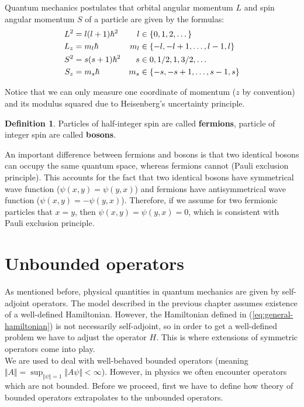 \documentclass[11pt, a4paper, german]{article}
\theoremstyle{plain}
\theoremstyle{definition}
\newtheorem{definition}[theorem]{Definition}
\theoremstyle{remark}
\numberwithin{equation}{section}
\numberwithin{theorem}{section}
\begin{document}
Quantum mechanics postulates that orbital angular momentum $L$ and spin angular momentum $S$ of a particle are given by the formulas:
\begin{align}
L^2 &= l(l+1)\hbar^2 &l   &\in \mathbb \{0, 1, 2, \dots\} \label{eq:l2} \\
L_z &= m_l\hbar      &m_l &\in \{-l, -l+1, \dots, l-1, l\} \label{eq:lz}\\
S^2 &= s(s+1)\hbar^2 &s   &\in {0, 1/2, 1, 3/2, \dots} \label{eq:s2}\\
S_z &= m_s\hbar      &m_s &\in \{-s, -s+1, \dots, s-1, s\} \label{eq:sz}
\end{align}

Notice that we can only measure one coordinate of momentum ($z$ by convention) and its modulus squared due to Heisenberg's uncertainty principle.

\begin{definition}
Particles of half-integer spin are called \textbf{fermions}, particle of integer spin are called \textbf{bosons}.
\end{definition}

An important difference between fermions and bosons is that two identical bosons can occupy the same quantum space, whereas fermions cannot (Pauli exclusion principle). This accounts for the fact that two identical bosons have symmetrical wave function ($\psi(x, y) = \psi(y, x)$) and fermions have antisymmetrical wave function ($\psi(x, y) = -\psi(y, x)$). Therefore, if we assume for two fermionic particles that $x=y$, then $\psi(x,y)=\psi(y,x)=0$, which is consistent with Pauli exclusion principle.\\

\section{Unbounded operators}\label{sec:self-adjoint-operators}

As mentioned before, physical quantities in quantum mechanics are given by self-adjoint operators. The model described in the previous chapter assumes existence of a well-defined Hamiltonian. However, the Hamiltonian defined in (\ref{eq:general-hamiltonian}) is not necessarily self-adjoint, so in order to get a well-defined problem we have to adjust the operator $H$. This is where extensions of symmetric operators come into play.\\

We are used to deal with well-behaved bounded operators (meaning $\Vert A\Vert = \sup_{\Vert \psi \Vert = 1} \Vert A \psi \Vert < \infty$). However, in physics we often encounter operators which are not bounded. Before we proceed, first we have to define how theory of bounded operators extrapolates to the unbounded operators. \\
\end{document}
